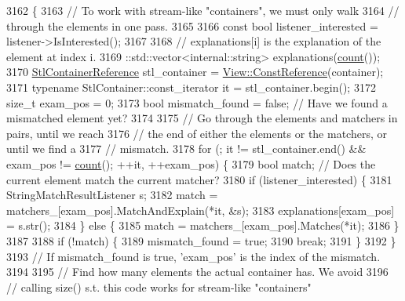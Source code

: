 \begin{DoxyCode}
3162                                                                     \{
3163     \textcolor{comment}{// To work with stream-like "containers", we must only walk}
3164     \textcolor{comment}{// through the elements in one pass.}
3165 
3166     \textcolor{keyword}{const} \textcolor{keywordtype}{bool} listener\_interested = listener->IsInterested();
3167 
3168     \textcolor{comment}{// explanations[i] is the explanation of the element at index i.}
3169     ::std::vector<internal::string> explanations(\hyperlink{gmock__stress__test_8cc_afd9db40e3361ae09188795e8cbe19752}{count}());
3170     \hyperlink{classtesting_1_1internal_1_1ElementsAreMatcherImpl_ad5d20c1aa6e8c06c82fe3ac4d68c2278}{StlContainerReference} stl\_container = 
      \hyperlink{classtesting_1_1internal_1_1StlContainerView_a36eccf53329730f6e55c12002128bf25}{View::ConstReference}(container);
3171     \textcolor{keyword}{typename} StlContainer::const\_iterator it = stl\_container.begin();
3172     \textcolor{keywordtype}{size\_t} exam\_pos = 0;
3173     \textcolor{keywordtype}{bool} mismatch\_found = \textcolor{keyword}{false};  \textcolor{comment}{// Have we found a mismatched element yet?}
3174 
3175     \textcolor{comment}{// Go through the elements and matchers in pairs, until we reach}
3176     \textcolor{comment}{// the end of either the elements or the matchers, or until we find a}
3177     \textcolor{comment}{// mismatch.}
3178     \textcolor{keywordflow}{for} (; it != stl\_container.end() && exam\_pos != \hyperlink{gmock__stress__test_8cc_afd9db40e3361ae09188795e8cbe19752}{count}(); ++it, ++exam\_pos) \{
3179       \textcolor{keywordtype}{bool} match;  \textcolor{comment}{// Does the current element match the current matcher?}
3180       \textcolor{keywordflow}{if} (listener\_interested) \{
3181         StringMatchResultListener s;
3182         match = matchers\_[exam\_pos].MatchAndExplain(*it, &s);
3183         explanations[exam\_pos] = s.str();
3184       \} \textcolor{keywordflow}{else} \{
3185         match = matchers\_[exam\_pos].Matches(*it);
3186       \}
3187 
3188       \textcolor{keywordflow}{if} (!match) \{
3189         mismatch\_found = \textcolor{keyword}{true};
3190         \textcolor{keywordflow}{break};
3191       \}
3192     \}
3193     \textcolor{comment}{// If mismatch\_found is true, 'exam\_pos' is the index of the mismatch.}
3194 
3195     \textcolor{comment}{// Find how many elements the actual container has.  We avoid}
3196     \textcolor{comment}{// calling size() s.t. this code works for stream-like "containers"}

\end{DoxyCode}
